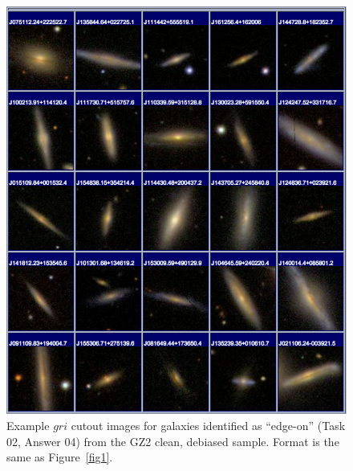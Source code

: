 \documentclass[useAMS,usenatbib]{mn2e}
\begin{document}
\newpage
\clearpage
\begin{figure}
\includegraphics[angle=0,width=7.0in]{figures/gallery/edgeon.png}
\caption{Example $gri$ cutout images for galaxies identified as ``edge-on'' (Task 02, Answer 04) from the GZ2 clean, debiased sample. Format is the same as Figure~\ref{fig1}.}
\end{figure}
\end{document}
